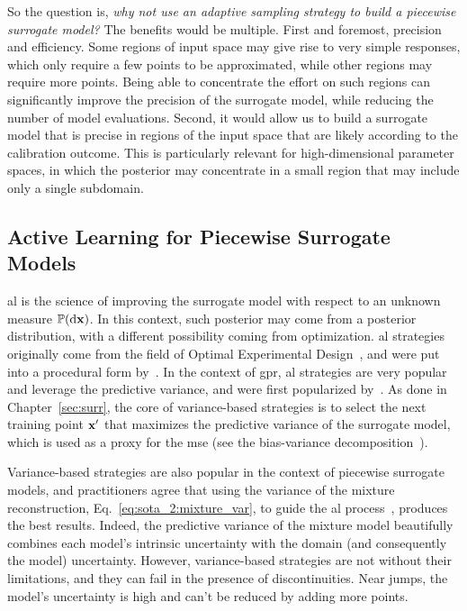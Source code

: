 \smallskip
So the question is, \textit{why not use an adaptive sampling strategy to build a piecewise surrogate model?} The benefits would be multiple. First and foremost, precision and efficiency. Some regions of input space may give rise to very simple responses, which only require a few points to be approximated, while other regions may require more points. Being able to concentrate the effort on such regions can significantly improve the precision of the surrogate model, while reducing the number of model evaluations. Second, it would allow us to build a surrogate model that is precise in regions of the input space that are likely according to the calibration outcome. This is particularly relevant for high-dimensional parameter spaces, in which the posterior may concentrate in a small region that may include only a single subdomain.

\subsection{Active Learning for Piecewise Surrogate Models}

\gls{al} is the science of improving the surrogate model with respect to an unknown measure $\mathbb{P}(\text{d} \mathbf{x})$. In this context, such posterior may come from a posterior distribution, with a different possibility coming from optimization. \gls{al} strategies originally come from the field of Optimal Experimental Design~\cite{kiefer1959,kiefer1960}, and were put into a procedural form by~\cite{fedorov1972}. In the context of \gls{gpr}, \gls{al} strategies are very popular and leverage the predictive variance, and were first popularized by~\cite{mackay1992}. As done in Chapter~\ref{sec:surr}, the core of variance-based strategies is to select the next training point $\mathbf{x}^\prime$ that maximizes the predictive variance of the surrogate model, which is used as a proxy for the \gls{mse} (see the bias-variance decomposition~\cite{gp_rasmussen}).

\smallskip
Variance-based strategies are also popular in the context of piecewise surrogate models, and practitioners agree that using the variance of the mixture reconstruction, Eq.~\eqref{eq:sota_2:mixture_var}, to guide the \gls{al} process~\cite{park2025}, produces the best results. Indeed, the predictive variance of the mixture model beautifully combines each model's intrinsic uncertainty with the domain (and consequently the model) uncertainty. However, variance-based strategies are not without their limitations, and they can fail in the presence of discontinuities. Near jumps, the model's uncertainty is high and can't be reduced by adding more points.

